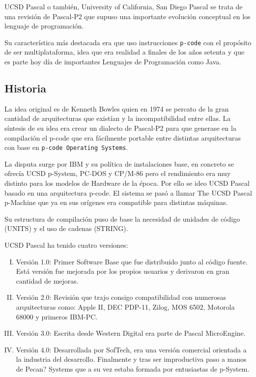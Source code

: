 %

UCSD Pascal o también, University of California, San Diego Pascal se 
trata de una revisión de Pascal-P2 que supuso una importante evolución 
conceptual en los lenguaje de programación.

Su característica más destacada era que uso instrucciones \texttt{p-code} con el 
propósito de ser multiplataforma, idea que era realidad a finales de los años 
setenta y que es parte hoy día de importantes Lenguajes de Programación como 
Java.

\subsection{Historia}

La idea original es de Kenneth Bowles quien en 1974 se percato de la gran 
cantidad de arquitecturas que existían y la incompatibilidad entre ellas. La 
síntesis de su idea era crear un dialecto de Pascal-P2 para que generase en la 
compilación el p-code que era fácilmente portable entre distintas arquitecturas 
con base en \texttt{p-code Operating Systems}. 


La disputa surge por IBM y su política de instalaciones base, en concreto se 
ofrecía UCSD p-System, PC-DOS y CP/M-86 pero el rendimiento era muy distinto 
para los modelos de Hardware de la época. Por ello se ideo UCSD Pascal basado 
en una arquitectura p-code. El sistema se pasó a llamar The UCSD Pascal 
p-Machine que ya en sus orígenes era compatible para distintas máquinas. 


Su estructura de compilación puso de base la necesidad de unidades de código 
(UNITS) y el uso de cadenas (STRING).

UCSD Pascal ha tenido cuatro versiones:

\begin{enumerate}[I.]

\item Versión 1.0: Primer Software Base que fue distribuido junto al código 
fuente. Está versión fue mejorada por los propios usuarios y derivaron en gran 
cantidad de mejoras.

\item Versión 2.0: Revisión que trajo consigo compatibilidad con numerosas 
arquitecturas como: Apple II, DEC PDP-11, Zilog, MOS 6502,  Motorola 68000 y 
primeros IBM-PC.

\item Versión 3.0: Escrita desde Western Digital era parte de Pascal 
MicroEngine.

\item Versión 4.0: Desarrollada por SofTech, era una versión comercial 
orientada a la industria del desarrollo. Finalmente y tras ser improductiva paso 
a manos de Pecan? Systems que a su vez estaba formada por entusiastas de 
p-System. 

\end{enumerate}

